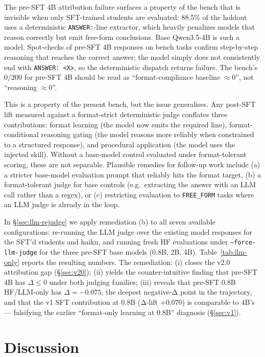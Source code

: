 \documentclass[10pt]{article}
\newcommand{\Qwenf}{Qwen3.5-4B\xspace}
\begin{document}
The pre-SFT 4B attribution failure surfaces a property of the bench that is invisible when only SFT-trained students are evaluated: 88.5\% of the holdout uses a deterministic \texttt{ANSWER:}-line extractor, which heavily penalizes models that reason correctly but emit free-form conclusions. Base \Qwenf{} is such a model. Spot-checks of pre-SFT 4B responses on bench tasks confirm step-by-step reasoning that reaches the correct answer; the model simply does not consistently end with \texttt{ANSWER: <X>}, so the deterministic dispatch returns failure. The bench's $0/200$ for pre-SFT 4B should be read as ``format-compliance baseline $\approx 0$'', not ``reasoning $\approx 0$''.

This is a property of the present bench, but the issue generalises. Any post-SFT lift measured against a format-strict deterministic judge conflates three contributions: format learning (the model now emits the required line), format-conditional reasoning gating (the model reasons more reliably when constrained to a structured response), and procedural application (the model uses the injected skill). Without a base-model control evaluated under format-tolerant scoring, these are not separable. Plausible remedies for follow-up work include (a) a stricter base-model evaluation prompt that reliably hits the format target, (b) a format-tolerant judge for base controls (e.g.\ extracting the answer with an LLM call rather than a regex), or (c) restricting evaluation to \texttt{FREE\_FORM} tasks where an LLM judge is already in the loop.

In \S\ref{sec:llm-rejudge} we apply remediation (b) to all seven available configurations: re-running the LLM judge over the existing model responses for the SFT'd students and haiku, and running fresh HF evaluations under \texttt{--force-llm-judge} for the three pre-SFT base models (0.8B, 2B, 4B). Table~\ref{tab:llm-only} reports the resulting numbers. The remediation: (i) closes the v2.0 attribution gap (\S\ref{sec:v20}); (ii) yields the counter-intuitive finding that pre-SFT 4B has $\Delta \leq 0$ under both judging families; (iii) reveals that pre-SFT 0.8B HF/LLM-only has $\Delta = -0.075$, the deepest negative-Δ point in the trajectory, and that the v1 SFT contribution at 0.8B (Δ-lift $+0.070$) is comparable to 4B's --- falsifying the earlier ``format-only learning at 0.8B'' diagnosis (\S\ref{sec:v1}).

\section{Discussion}
\end{document}
